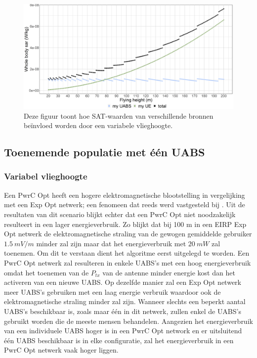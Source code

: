 \documentclass[twocolumn]{phdsymp_dutch}
\begin{document}
\begin{figure}[]
\centering
  \includegraphics[width=\linewidth]{s1/fhvssar.png}
  \caption{
    Deze figuur toont hoe SAT-waarden van verschillende bronnen be\"invloed worden door een variabele vlieghoogte.}
  \label{fig:s1_fhsar}
\end{figure}

\FloatBarrier
\subsection{Toenemende populatie met \'e\'en UABS}
\subsubsection{Variabel vlieghoogte}
Een \gls{PwrC Opt} heeft een hogere elektromagnetische blootstelling in vergelijking met een
 \gls{Exp Opt} netwerk; een fenomeen dat reeds werd vastgesteld bij \cite{J1}. 
Uit de resultaten van dit scenario blijkt echter dat een
\gls{PwrC Opt} niet noodzakelijk resulteert in een lager energieverbruik.
Zo blijkt dat bij 100 m in een  \gls{EIRP} \gls{Exp Opt} netwerk
 de elektromagnetische straling van de gewogen gemiddelde gebruiker
 $1.5\ mV/m$ minder zal zijn maar dat het energieverbruik met $20\ mW$ zal toenemen.
Om dit te verstaan dient het algoritme eerst uitgelegd te worden.
Een  \gls{PwrC Opt} netwerk zal resulteren in enkele \gls{UABS}'s met een hoog energieverbruik 
omdat het toenemen van de $P_{tx}$ van de antenne minder energie kost dan het activeren van een nieuwe \gls{UABS}.
Op dezelfde manier zal een \gls{Exp Opt} netwerk meer \gls{UABS}'s gebruiken met een laag energie verbruik waardoor ook de elektromagnetische straling minder zal zijn.
Wanneer slechts een beperkt aantal \gls{UABS}'s beschikbaar is, zoals maar \'e\'en in dit netwerk, 
zullen enkel de \gls{UABS}'s gebruikt worden die de meeste mensen behandelen.
Aangezien het energieverbruik van een individuele \gls{UABS} hoger is in een \gls{PwrC Opt} network en er uitsluitend 
\'e\'en \gls{UABS} beschikbaar is in elke configuratie, zal 
 het energieverbruik in een \gls{PwrC Opt} netwerk vaak hoger liggen.
\end{document}
